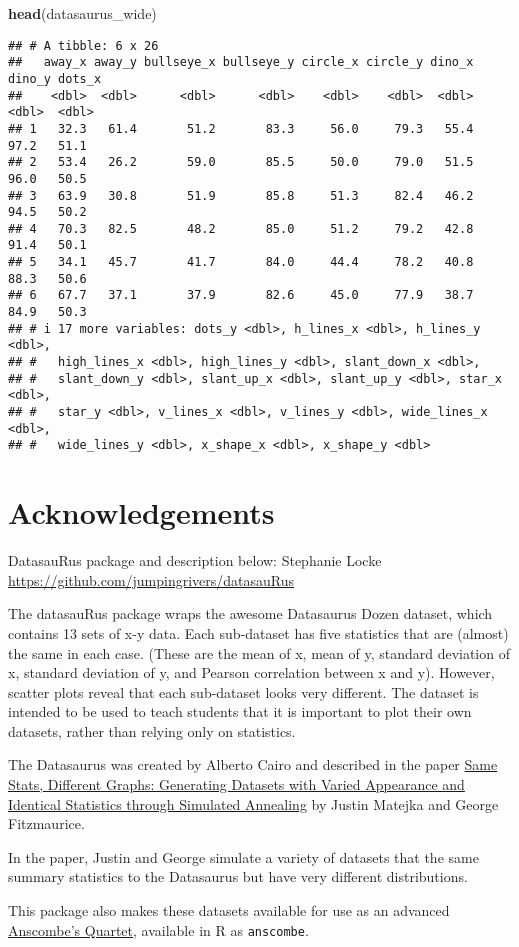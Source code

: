 \documentclass[
]{article}
\newenvironment{Shaded}{\begin{snugshade}}{\end{snugshade}}
\newcommand{\FunctionTok}[1]{\textcolor[rgb]{0.13,0.29,0.53}{\textbf{#1}}}
\newcommand{\NormalTok}[1]{#1}
\begin{document}
\begin{Shaded}
\begin{Highlighting}[]
\FunctionTok{head}\NormalTok{(datasaurus\_wide)}
\end{Highlighting}
\end{Shaded}

\begin{verbatim}
## # A tibble: 6 x 26
##   away_x away_y bullseye_x bullseye_y circle_x circle_y dino_x dino_y dots_x
##    <dbl>  <dbl>      <dbl>      <dbl>    <dbl>    <dbl>  <dbl>  <dbl>  <dbl>
## 1   32.3   61.4       51.2       83.3     56.0     79.3   55.4   97.2   51.1
## 2   53.4   26.2       59.0       85.5     50.0     79.0   51.5   96.0   50.5
## 3   63.9   30.8       51.9       85.8     51.3     82.4   46.2   94.5   50.2
## 4   70.3   82.5       48.2       85.0     51.2     79.2   42.8   91.4   50.1
## 5   34.1   45.7       41.7       84.0     44.4     78.2   40.8   88.3   50.6
## 6   67.7   37.1       37.9       82.6     45.0     77.9   38.7   84.9   50.3
## # i 17 more variables: dots_y <dbl>, h_lines_x <dbl>, h_lines_y <dbl>,
## #   high_lines_x <dbl>, high_lines_y <dbl>, slant_down_x <dbl>,
## #   slant_down_y <dbl>, slant_up_x <dbl>, slant_up_y <dbl>, star_x <dbl>,
## #   star_y <dbl>, v_lines_x <dbl>, v_lines_y <dbl>, wide_lines_x <dbl>,
## #   wide_lines_y <dbl>, x_shape_x <dbl>, x_shape_y <dbl>
\end{verbatim}

\section{Acknowledgements}\label{acknowledgements}

DatasauRus package and description below: Stephanie Locke
\url{https://github.com/jumpingrivers/datasauRus}

The datasauRus package wraps the awesome Datasaurus Dozen dataset, which
contains 13 sets of x-y data. Each sub-dataset has five statistics that
are (almost) the same in each case. (These are the mean of x, mean of y,
standard deviation of x, standard deviation of y, and Pearson
correlation between x and y). However, scatter plots reveal that each
sub-dataset looks very different. The dataset is intended to be used to
teach students that it is important to plot their own datasets, rather
than relying only on statistics.

The Datasaurus was created by Alberto Cairo and described in the paper
\href{https://www.autodeskresearch.com/publications/samestats}{Same
Stats, Different Graphs: Generating Datasets with Varied Appearance and
Identical Statistics through Simulated Annealing} by Justin Matejka and
George Fitzmaurice.

In the paper, Justin and George simulate a variety of datasets that the
same summary statistics to the Datasaurus but have very different
distributions.

This package also makes these datasets available for use as an advanced
\href{https://en.wikipedia.org/wiki/Anscombe\%27s_quartet}{Anscombe's
Quartet}, available in R as \texttt{anscombe}.
\end{document}
